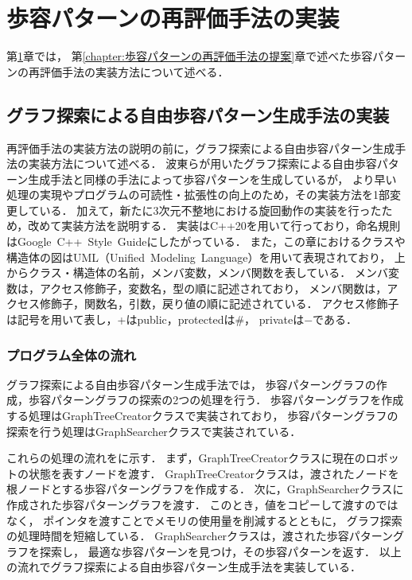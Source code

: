 ﻿%

\chapter{歩容パターンの再評価手法の実装}\label{chapter:歩容パターンの再評価手法の実装}
第\ref{chapter:歩容パターンの再評価手法の実装}章では，
第\ref{chapter:歩容パターンの再評価手法の提案}章で述べた歩容パターンの再評価手法の実装方法について述べる．

\section{グラフ探索による自由歩容パターン生成手法の実装}
再評価手法の実装方法の説明の前に，グラフ探索による自由歩容パターン生成手法の実装方法について述べる．
波東らが用いたグラフ探索による自由歩容パターン生成手法と同様の手法によって歩容パターンを生成しているが，
より早い処理の実現やプログラムの可読性・拡張性の向上のため，その実装方法を1部変更している．
加えて，新たに3次元不整地における旋回動作の実装を行ったため，改めて実装方法を説明する．
実装はC++20を用いて行っており，命名規則はGoogle~C++~Style~Guide\cite{cita:google_cpp_style_guide}にしたがっている．
また，この章におけるクラスや構造体の図はUML（Unified~Modeling~Language）を用いて表現されており，
上からクラス・構造体の名前，メンバ変数，メンバ関数を表している．
メンバ変数は，アクセス修飾子，変数名，型の順に記述されており，
メンバ関数は，アクセス修飾子，関数名，引数，戻り値の順に記述されている．
アクセス修飾子は記号を用いて表し，+はpublic，protectedは\#，
privateは$-$である．

\subsection{プログラム全体の流れ}
グラフ探索による自由歩容パターン生成手法では，
歩容パターングラフの作成，歩容パターングラフの探索の2つの処理を行う．
歩容パターングラフを作成する処理はGraphTreeCreatorクラスで実装されており，
歩容パターングラフの探索を行う処理はGraphSearcherクラスで実装されている．

これらの処理の流れをに示す．
まず，GraphTreeCreatorクラスに現在のロボットの状態を表すノードを渡す．
GraphTreeCreatorクラスは，渡されたノードを根ノードとする歩容パターングラフを作成する．
次に，GraphSearcherクラスに作成された歩容パターングラフを渡す．
このとき，値をコピーして渡すのではなく，
ポインタを渡すことでメモリの使用量を削減するとともに，
グラフ探索の処理時間を短縮している．
GraphSearcherクラスは，渡された歩容パターングラフを探索し，
最適な歩容パターンを見つけ，その歩容パターンを返す．
以上の流れでグラフ探索による自由歩容パターン生成手法を実装している．



